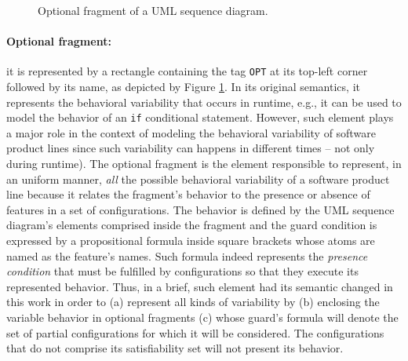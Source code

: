 \begin{figure}[h!]
\begin{center}
\resizebox{!}{4.5cm}{

}
\end{center}
\caption{Optional fragment of a UML sequence diagram.}
\label{fig:optFrag_SD}
\end{figure}

\paragraph{Optional fragment:\label{par:optFragModeling}} it is represented by
a rectangle containing the tag \texttt{OPT} at its top-left corner followed by
its name, as depicted by Figure \ref{fig:optFrag_SD}. In its original
semantics, it represents the behavioral variability that occurs in runtime,
e.g., it can be used to model the behavior of an \texttt{if} conditional
statement. However, such element plays a major role in the context of modeling
the behavioral variability of software product lines since such variability can happens in
different times -- not only during runtime). The optional fragment is the
element responsible to represent, in an uniform manner, \emph{all} the possible
behavioral variability of a software product line because it relates the
fragment's behavior to the  presence or absence of features in a set of
configurations.  The behavior is defined by the UML sequence diagram's elements
comprised inside the fragment and the guard condition is expressed by a
propositional formula inside square brackets whose atoms are named as the
feature's names.  Such formula indeed represents the \emph{presence condition}
that must be fulfilled by configurations so that they execute  its represented
behavior.  Thus, in a brief, such element had its semantic changed in this work
in order to (a) represent all kinds of variability by (b) enclosing the
variable behavior in optional fragments (c) whose guard's formula will denote
the set of partial configurations for which it will be considered. The
configurations that do not comprise its satisfiability set will not present its
behavior. 

